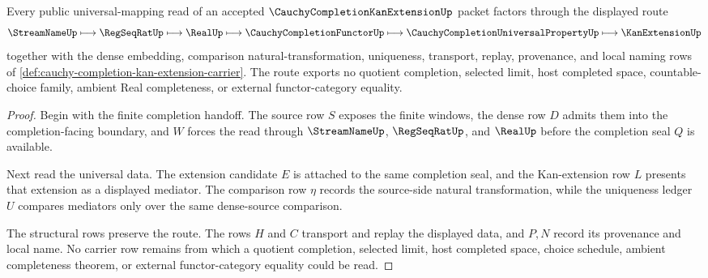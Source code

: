 \begin{theorem}
\label{thm:cauchy-completion-kan-extension-universal-route}
Every public universal-mapping read of an accepted $\CauchyCompletionKanExtensionUp$ packet factors through the displayed route
$$
\StreamNameUp \longmapsto \RegSeqRatUp \longmapsto \RealUp \longmapsto \CauchyCompletionFunctorUp \longmapsto \CauchyCompletionUniversalPropertyUp \longmapsto \KanExtensionUp
$$
together with the dense embedding, comparison natural-transformation, uniqueness, transport, replay, provenance, and local naming rows of \autoref{def:cauchy-completion-kan-extension-carrier}. The route exports no quotient completion, selected limit, host completed space, countable-choice family, ambient Real completeness, or external functor-category equality.
\end{theorem}
\begin{proof}
Begin with the finite completion handoff. The source row $S$ exposes the finite windows, the dense row $D$ admits them into the completion-facing boundary, and $W$ forces the read through $\StreamNameUp$, $\RegSeqRatUp$, and $\RealUp$ before the completion seal $Q$ is available.

Next read the universal data. The extension candidate $E$ is attached to the same completion seal, and the Kan-extension row $L$ presents that extension as a displayed mediator. The comparison row $\eta$ records the source-side natural transformation, while the uniqueness ledger $U$ compares mediators only over the same dense-source comparison.

The structural rows preserve the route. The rows $H$ and $C$ transport and replay the displayed data, and $P,N$ record its provenance and local name. No carrier row remains from which a quotient completion, selected limit, host completed space, choice schedule, ambient completeness theorem, or external functor-category equality could be read.
\end{proof}



